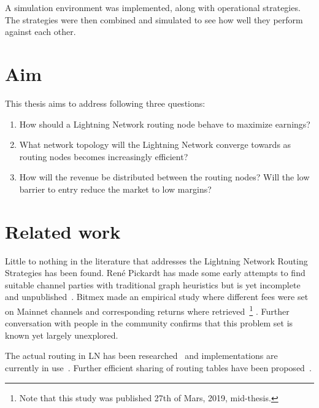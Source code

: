 A simulation environment was implemented, along with operational strategies. The strategies were then combined and simulated to see how well they perform against each other.

\section{Aim}
    \label{sec:aim}

This thesis aims to address following three questions:

	\begin{enumerate}
		\item How should a \gls{Lightning Network} routing node behave to maximize earnings?
	
		\item What network topology will the \gls{Lightning Network} converge towards as routing nodes becomes increasingly efficient?
		
		\item How will the revenue be distributed between the routing nodes? Will the low barrier to entry reduce the market to low margins? 
		
	\end{enumerate}
	
\section{Related work}
    \label{sec:related_work}

	Little to nothing in the literature that addresses the Lightning Network Routing Strategies has been found. René Pickardt has made some early attempts to find suitable channel parties with traditional graph heuristics but is yet incomplete and unpublished~\cite{repository:rene:pickard}. Bitmex made an empirical study where different fees were set on Mainnet channels and corresponding returns where retrieved~\cite{bitmex:fee}\footnote{Note that this study was published 27th of Mars, 2019, mid-thesis.} . Further conversation with people in the community confirms that this problem set is known yet largely unexplored.
	
	The actual routing in LN has been researched~\cite{distasi:avallone:cononico:routing} and implementations are currently in use~\cite{repository:clightning, repository:lnd, repository:eclair, repository:lit}. Further efficient sharing of routing tables have been proposed~\cite{gunspan:marco:ant}.
	

